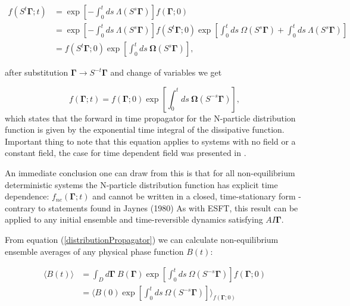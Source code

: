 \documentclass[a4paper,12pt]{article}
\begin{document}
\begin{equation}
\begin{aligned}
  f(S^t\bm{\Gamma};t) &= \exp[-\int_0^t ds\ \Lambda(S^s\bm{\Gamma})]f(\bm{\Gamma};0)\\
  &=\exp[-\int_0^t ds\ \Lambda(S^s\bm{\Gamma})]f(S^t \bm{\Gamma};0) \exp[\int_0^t ds\ \Omega(S^s \bm{\Gamma}) + \int_0^t ds\ \Lambda(S^s\bm{\Gamma})]\\
  &=f(S^t \bm{\Gamma};0) \exp[\int_0^t ds\ \bm{\Omega}(S^s \bm{\Gamma})],
\end{aligned}
\end{equation}

after substitution $\bm{\Gamma} \to S^{-t}\bm{\Gamma}$ and change of variables we get 

\begin{equation}
\label{distributionPropagator}
    f(\bm{\Gamma};t)=f(\bm{\Gamma};0)\exp[\int_0^t ds\ \bm{\Omega}(S^{-s} \bm{\Gamma})],
\end{equation}
which states that the forward in time propagator for the N-particle distribution function is given by the exponential time integral of the dissipative function. Important thing to note that this equation applies to systems with no field or a constant field, the case for time dependent field was presented in \cite{Williams:2008ft}.

An immediate conclusion one can draw from this is that for all non-equilibrium deterministic systems the N-particle distribution function has explicit time dependence: $f_{ne}(\bm{\Gamma};t)$ and cannot be written in a closed, time-stationary form - contrary to statements found in Jaynes (1980)
As with ESFT, this result can be applied to any initial ensemble and time-reversible dynamics satisfying $AI\bm{\Gamma}$.

From equation (\ref{distributionPropagator}) we can calculate non-equilibrium ensemble averages of any physical phase function $B(t)$:

\begin{equation}
\begin{aligned}
	  \langle B(t) \rangle &= \int_D d\bm{\Gamma}\ B(\bm{\Gamma})\exp[\int_0^{t} ds\ \Omega(S^{-s}\bm{\Gamma})]f(\bm{\Gamma};0)\\
	  &= \langle B(0) \exp[\int_0^{t} ds\ \Omega(S^{-s}\bm{\Gamma})] \rangle_{f(\bm{\Gamma};0)}
\end{aligned}
\end{equation}
\end{document}
